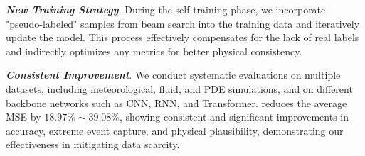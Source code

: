 \textit{\textbf{New Training Strategy}}. During the self-training phase, we incorporate "pseudo-labeled" samples from beam search into the training data and iteratively update the model. This process effectively compensates for the lack of real labels and indirectly optimizes any metrics for better physical consistency.

\textit{\textbf{Consistent Improvement}}. We conduct systematic evaluations on multiple datasets, including meteorological, fluid, and PDE simulations, and on different backbone networks such as CNN, RNN, and Transformer. \method{} reduces the average MSE by $18.97\%\sim39.08\%$, showing consistent and significant improvements in accuracy, extreme event capture, and physical plausibility, demonstrating our effectiveness in mitigating data scarcity.














